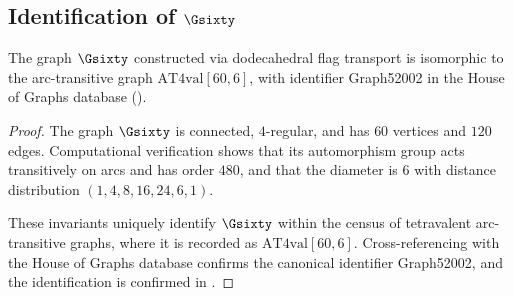 \subsection{Identification of $\Gsixty$}

\begin{proposition}
The graph $\Gsixty$ constructed via dodecahedral flag transport is
isomorphic to the arc-transitive graph $\mathrm{AT4val}[60,6]$,
with identifier Graph52002 in the House of Graphs database
(\cite{potocnik_graphsym,house_of_graphs,potocnik_private}).
\end{proposition}

\begin{proof}
The graph $\Gsixty$ is connected, $4$-regular, and has $60$ vertices and
$120$ edges. Computational verification shows that its automorphism group
acts transitively on arcs and has order $480$, and that the diameter is $6$
with distance distribution $(1,4,8,16,24,6,1)$.

These invariants uniquely identify $\Gsixty$ within the census of
tetravalent arc-transitive graphs, where it is recorded as
$\mathrm{AT4val}[60,6]$. Cross-referencing with the House of Graphs
database confirms the canonical identifier Graph52002, and the
identification is confirmed in \cite{potocnik_private}.
\end{proof}
